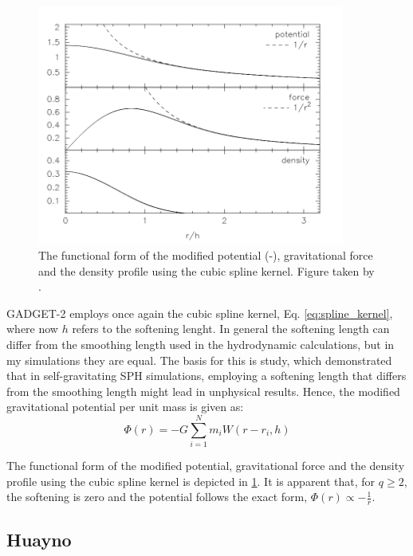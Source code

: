 \begin{figure}[H]
    \centering
    \includegraphics[width=0.9\textwidth]{Thesis/figures/smoothening.pdf}
    \caption{The functional form of the modified potential (-), gravitational force and the density profile using the cubic spline kernel. Figure taken by \cite{price2007energy}.}
    \label{fig:smoothened_gravity}
\end{figure}

GADGET-2 employs once again the cubic spline kernel, Eq. \eqref{eq:spline_kernel}, where now $h$ refers to the softening lenght. In general the softening length can differ from the smoothing length used in the hydrodynamic calculations, but in my simulations they are equal. The basis for this is \cite{bate1997resolution} study, which demonstrated that in self-gravitating SPH simulations, employing a softening length that differs from the smoothing length might lead in unphysical results. Hence, the modified gravitational potential per unit mass is given as:
\begin{equation}\label{eq:softened_gravity}
   \Phi(r) = -G\sum_{i=1}^{N} m_i W(r-r_i,h)
\end{equation}


The functional form of the modified potential, gravitational force and the density profile using the cubic spline kernel is depicted in \cref{fig:smoothened_gravity}. It is apparent that, for $q \geq 2$, the softening is zero and the potential follows the exact form, $\Phi(r) \propto -\frac{1}{r}$. 

\subsection{Huayno}\label{sub:huayano}

